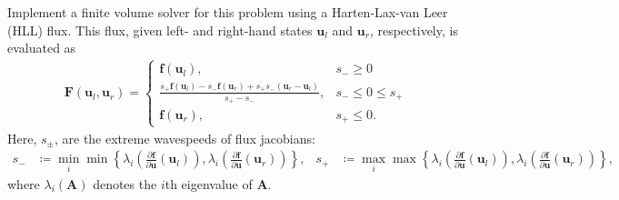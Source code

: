 \documentclass[11pt]{amsart}
\newcommand{\bs}[1]{\boldsymbol{#1}}
\newcommand{\pfpx}[2]{\frac{\partial #1}{\partial #2}}
\begin{document}
Implement a finite volume solver for this problem using a Harten-Lax-van Leer (HLL) flux. This flux, given left- and right-hand states $\bs{u}_l$ and $\bs{u}_r$, respectively, is evaluated as
\begin{align*}
  \bs{F}(\bs{u}_l,\bs{u}_r) = \left\{ \begin{array}{rl} \bs{f}(\bs{u}_l), & s_- \geq 0 \\
                                                        \frac{s_+ \bs{f}(\bs{u}_l) - s_- \bs{f}(\bs{u}_r) + s_+ s_- (\bs{u}_r - \bs{u}_l)}{s_+ - s_-}, & s_- \leq 0 \leq s_+ \\
\bs{f}(\bs{u}_r), & s_+ \leq 0.\end{array}\right.
\end{align*}
Here, $s_{\pm}$, are the extreme wavespeeds of flux jacobians:
\begin{align*}
  s_- &\coloneqq \min_{i} \min \left\{ \lambda_i\left(\pfpx{\bs{f}}{\bs{u}}\left(\bs{u}_l\right)\right), \lambda_i\left(\pfpx{\bs{f}}{\bs{u}}\left(\bs{u}_r\right) \right)\right\}, &
  s_+ &\coloneqq \max_{i} \max \left\{ \lambda_i\left(\pfpx{\bs{f}}{\bs{u}}\left(\bs{u}_l\right)\right), \lambda_i\left(\pfpx{\bs{f}}{\bs{u}}\left(\bs{u}_r\right) \right)\right\},
\end{align*}
where $\lambda_i(\bs{A})$ denotes the $i$th eigenvalue of $\bs{A}$.
\end{document}
